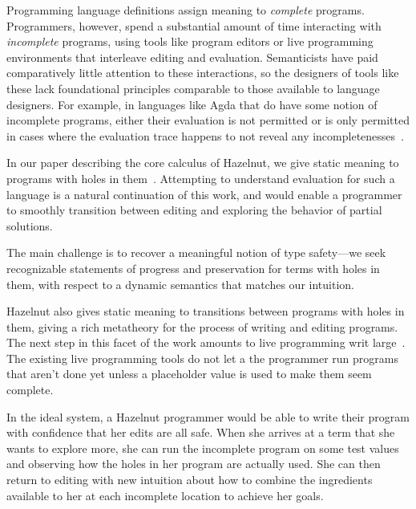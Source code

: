 Programming language definitions assign meaning to \textit{complete}
programs. Programmers, however, spend a substantial amount of time
interacting with \textit{incomplete} programs, using tools like program
editors or live programming environments that interleave editing and
evaluation. Semanticists have paid comparatively little attention to these
interactions, so the designers of tools like these lack foundational
principles comparable to those available to language designers. For
example, in languages like Agda that do have some notion of incomplete
programs, either their evaluation is not permitted or is only permitted in
cases where the evaluation trace happens to not reveal any
incompletenesses~\cite{norell:thesis}.

In our paper describing the core calculus of Hazelnut, we give static
meaning to programs with holes in them~\cite{DBLP:journals/corr/OmarVHAH16}.
Attempting to understand evaluation for such a language is a natural
continuation of this work, and would enable a programmer to smoothly
transition between editing and exploring the behavior of partial solutions.

The main challenge is to recover a meaningful notion of type safety---we
seek recognizable statements of progress and preservation for terms with
holes in them, with respect to a dynamic semantics that matches our
intuition.

Hazelnut also gives static meaning to transitions between programs with
holes in them, giving a rich metatheory for the process of writing and
editing programs. The next step in this facet of the work amounts to live
programming writ large~\cite{burckhardt2013s}. The existing live
programming tools do not let a the programmer run programs that aren't done
yet unless a placeholder value is used to make them seem complete.

In the ideal system, a Hazelnut programmer would be able to write their
program with confidence that her edits are all safe. When she arrives at a
term that she wants to explore more, she can run the incomplete program on
some test values and observing how the holes in her program are actually
used. She can then return to editing with new intuition about how to
combine the ingredients available to her at each incomplete location to
achieve her goals.
